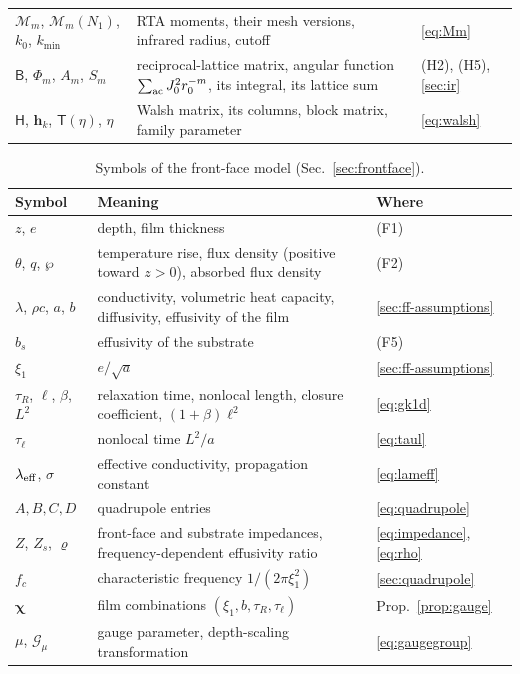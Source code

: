 \begin{table}[tbp]
\begin{ruledtabular}
\begin{tabular}{p{}p{}p{}}
$\mathcal M_m$, $\mathcal M_m(N_1)$, $k_0$, $k_{\min}$ & RTA moments, their mesh versions, infrared radius, cutoff & \eqref{eq:Mm}\\
$\mathsf B$, $\Phi_m$, $A_m$, $S_m$ & reciprocal-lattice matrix, angular function $\sum_{\rm ac}J_0^2r_0^{-m}$, its integral, its lattice sum & (H2), (H5), \ref{sec:ir}\\
$\mathsf H$, $\mathbf h_k$, $\mathsf T(\eta)$, $\eta$ & Walsh matrix, its columns, block matrix, family parameter & \eqref{eq:walsh}\\
\end{tabular}
\end{ruledtabular}
\end{table}

\begin{table}[tbp]
\caption{Symbols of the front-face model (Sec.~\ref{sec:frontface}).}
\label{tab:notation-film}
\footnotesize
\begin{ruledtabular}
\begin{tabular}{p{}p{}p{}}
Symbol & Meaning & Where\\ \hline
$z$, $e$ & depth, film thickness & (F1)\\
$\theta$, $q$, $\wp$ & temperature rise, flux density (positive toward $z>0$), absorbed flux density & (F2)\\
$\lambda$, $\rho c$, $a$, $b$ & conductivity, volumetric heat capacity, diffusivity, effusivity of the film & \ref{sec:ff-assumptions}\\
$b_s$ & effusivity of the substrate & (F5)\\
$\xi_1$ & $e/\sqrt a$ & \ref{sec:ff-assumptions}\\
$\tau_R$, $\ell$, $\beta$, $L^2$ & relaxation time, nonlocal length, closure coefficient, $(1+\beta)\ell^2$ & \eqref{eq:gk1d}\\
$\tau_\ell$ & nonlocal time $L^2/a$ & \eqref{eq:taul}\\
$\lambda_{\rm eff}$, $\sigma$ & effective conductivity, propagation constant & \eqref{eq:lameff}\\
$A,B,C,D$ & quadrupole entries & \eqref{eq:quadrupole}\\
$Z$, $Z_s$, $\varrho$ & front-face and substrate impedances, frequency-dependent effusivity ratio & \eqref{eq:impedance}, \eqref{eq:rho}\\
$f_c$ & characteristic frequency $1/(2\pi\xi_1^2)$ & \ref{sec:quadrupole}\\
$\bm\chi$ & film combinations $(\xi_1,b,\tau_R,\tau_\ell)$ & Prop.~\ref{prop:gauge}\\
$\mu$, $\mathcal G_\mu$ & gauge parameter, depth-scaling transformation & \eqref{eq:gaugegroup}\\
\end{tabular}
\end{ruledtabular}
\end{table}
